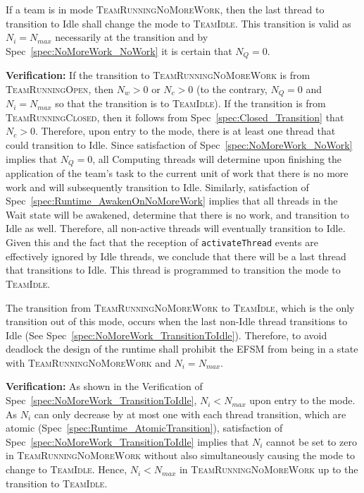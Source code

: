 \documentclass{article}
\newcommand{\TeamIdle}          {\textsc{TeamIdle}}
\newcommand{\TeamRunningOpen}   {\textsc{TeamRunningOpen}}
\newcommand{\TeamRunningClosed} {\textsc{TeamRunningClosed}}
\newcommand{\TeamRunningNoMoreWork} {\textsc{TeamRunningNoMoreWork}}
\begin{document}
\begin{spec}
\label{spec:NoMoreWork_TransitionToIdle}
If a team is in mode \TeamRunningNoMoreWork, then the last thread to transition
to Idle shall change the mode to \TeamIdle.  This transition is valid as $N_i =
N_{max}$ necessarily at the transition and by Spec~\ref{spec:NoMoreWork_NoWork}
it is certain that $N_Q = 0$.
\end{spec}
\textbf{Verification:}\hspace{0.125in}  If the transition to
{\TeamRunningNoMoreWork} is from \TeamRunningOpen, then $N_w > 0$ or $N_c > 0$
(to the contrary, $N_Q = 0$ and $N_i = N_{max}$ so that the transition is to
\TeamIdle).  If the transition is from \TeamRunningClosed, then it follows from
Spec~\ref{spec:Closed_Transition} that $N_c > 0$.  Therefore, upon entry to the
mode, there is at least one thread that could transition to Idle.  Since
satisfaction of Spec~\ref{spec:NoMoreWork_NoWork} implies that $N_Q = 0$, all
Computing threads will determine upon finishing the application of the team's
task to the current unit of work that there is no more work and will
subsequently transition to Idle.  Similarly, satisfaction of
Spec~\ref{spec:Runtime_AwakenOnNoMoreWork} implies that all threads in the Wait
state will be awakened, determine that there is no work, and transition to Idle
as well.  Therefore, all non-active threads will eventually transition to Idle.
Given this and the fact that the reception of \texttt{activateThread} events are
effectively ignored by Idle threads, we conclude that there will be a last
thread that transitions to Idle.  This thread is programmed to transition the
mode to \TeamIdle.

\begin{spec}
\label{spec:NoMoreWork_NeedThread}
The transition from {\TeamRunningNoMoreWork} to \TeamIdle, which is the only
transition out of this mode, occurs when the last non-Idle thread transitions to
Idle (See Spec~\ref{spec:NoMoreWork_TransitionToIdle}).  Therefore, to avoid
deadlock the design of the runtime shall prohibit the EFSM from being in a state
with {\TeamRunningNoMoreWork} and $N_i = N_{max}$.
\end{spec}
\textbf{Verification:}\hspace{0.125in} As shown in the Verification of
Spec~\ref{spec:NoMoreWork_TransitionToIdle},  $N_i < N_{max}$ upon entry to the
mode.  As $N_i$ can only decrease by at most one with each thread transition,
which are atomic (Spec~\ref{spec:Runtime_AtomicTransition}), satisfaction of
Spec~\ref{spec:NoMoreWork_TransitionToIdle} implies that $N_i$ cannot be set to
zero in {\TeamRunningNoMoreWork} without also simultaneously causing the mode to
change to \TeamIdle.  Hence, $N_i < N_{max}$ in {\TeamRunningNoMoreWork} up to
the transition to \TeamIdle.
\end{document}
